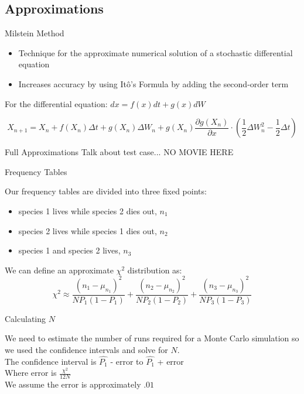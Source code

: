 \subsection{Approximations}

\begin{frame}{Milstein Method}

	\begin{itemize}
		\item Technique for the approximate numerical solution of a stochastic differential equation
		\item Increases accuracy by using It\^o's Formula by adding the second-order term
	\end{itemize} 
	
	\vfill
	
	For the differential equation: $dx = f(x) dt + g(x) dW$ 
	
		$$X_{n+1} = X_n + f(X_n)\Delta t + g(X_n) \Delta W_n + g(X_n) \frac{\partial g(X_n)}{\partial x}  \cdot \left(\frac{1}{2} \Delta W_n ^2 - \frac{1}{2} \Delta t \right)$$
	
	\vfill

\end{frame}

\begin{frame}{Full Approximations}
Talk about test case... NO MOVIE HERE 
\end{frame}

\begin{frame}{Frequency Tables}

Our frequency tables are divided into three fixed points: 

\begin{itemize}
	\item species 1 lives while species 2 dies out, $n_1$
	\item species 2 lives while species 1 dies out, $n_2$
	\item species 1 and species 2 lives, $n_3$
\end{itemize}
We can define an approximate $\chi^2$ distribution as:
$$ \chi^2 \approx \frac{\left(n_1 - \mu_{n_1}\right)^2}{N P_1 (1 - P_1)} + 
                  \frac{\left(n_2 - \mu_{n_2}\right)^2}{N P_2 (1 - P_2)} +
									\frac{\left(n_3 - \mu_{n_3}\right)^2}{N P_3 (1 - P_3)}$$
\end{frame}

 
\begin{frame}{Calculating $N$}
	
	\vfill
	
	We need to estimate the number of runs required for a Monte Carlo simulation so we used the confidence intervals and solve for $N$. \\
	The confidence interval is $\hat{P_1}$ - error to $\hat{P_1}$ + error \\
	Where error is $\frac{\chi^2}{12N}$ \\
	We assume the error is approximately $.01$ 
		
	\vfill
		
\end{frame}

